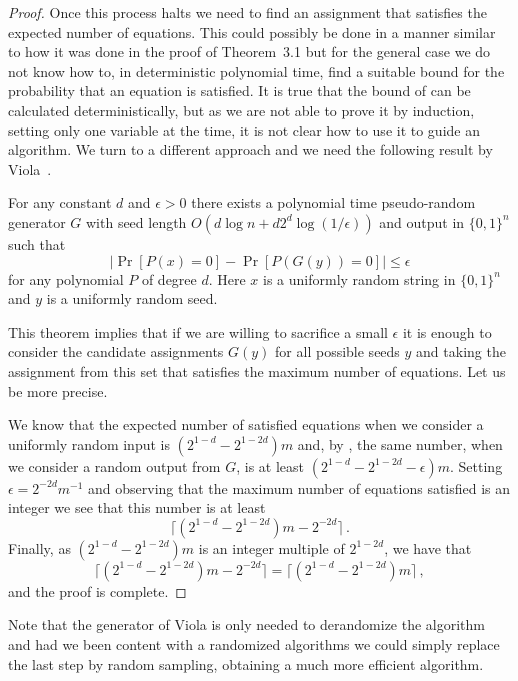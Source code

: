 \begin{proof}
Once this process halts we need to find an assignment that satisfies the
expected number of equations.  This could
possibly be done in a manner similar
to how it was done in the proof of Theorem~3.1
but for the general case we do not know how to, in deterministic 
polynomial time,
find a suitable bound for the probability that an equation
is satisfied.  It is true that the bound of 
can be calculated deterministically, but as we are not able to
prove it by induction, setting only one variable at the time,
it is not clear how to use it to guide an algorithm.
We turn to a different approach and we need the following
result by Viola~\cite{viola09}.

\begin{theorem}\label{thm:viola}
For any constant $d$ and $\epsilon > 0$ there exists
a polynomial time pseudo-random generator $G$ with
seed length $O(d \log n + d 2^d \log (1/\epsilon))$
and output in $\{ 0,1\}^n$ such that
$$
|\Pr[P(x)=0]- \Pr[P(G(y))=0]| \leq \epsilon
$$
for any polynomial $P$ of degree $d$.  Here $x$ is 
a uniformly random string in $\{ 0,1\}^n$ and
$y$ is a uniformly random seed.
\end{theorem}

This theorem implies that if we are willing
to sacrifice a small $\epsilon$ it is enough
to consider the candidate assignments 
$G(y)$ for all possible seeds $y$ and taking the assignment
from this set that satisfies the %
maximum
number of equations.  Let us be more precise.

We know that the expected number of satisfied
equations when we consider a uniformly random
input is $(2^{1-d}- 2^{1-2d}) m$ and, by
, the same number, when
we consider a random output from $G$, is
at least $(2^{1-d}- 2^{1-2d}-\epsilon) m$.
Setting $\epsilon= 2^{-2d} m^{-1}$ and observing that
the maximum number of equations satisfied is
an integer we see that this number is at least
$$
\lceil (2^{1-d}- 2^{1-2d}) m-2^{-2d} \rceil \,.
$$
Finally, as $(2^{1-d}- 2^{1-2d}) m$ is an integer
multiple of $2^{1-2d}$, we have that
$$
\lceil (2^{1-d}- 2^{1-2d}) m-2^{-2d} \rceil 
=\lceil (2^{1-d}- 2^{1-2d}) m \rceil\,,
$$
and the proof is complete.
\end{proof}

Note that the generator of Viola is only needed to
derandomize the algorithm and had we been content
with a randomized algorithms we could simply replace
the last step by random sampling, obtaining a much
more efficient algorithm.

